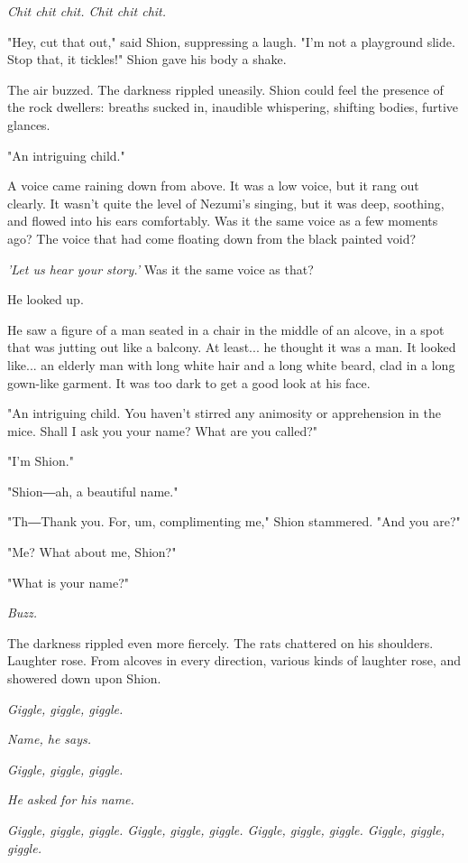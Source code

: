\emph{Chit chit chit. Chit chit chit.}

"Hey, cut that out," said Shion, suppressing a laugh. "I'm not a
playground slide. Stop that, it tickles!" Shion gave his body a shake.

The air buzzed. The darkness rippled uneasily. Shion could feel the
presence of the rock dwellers: breaths sucked in, inaudible whispering,
shifting bodies, furtive glances.

"An intriguing child."

A voice came raining down from above. It was a low voice, but it rang
out clearly. It wasn't quite the level of Nezumi's singing, but it was
deep, soothing, and flowed into his ears comfortably. Was it the same
voice as a few moments ago? The voice that had come floating down from
the black painted void?

\emph{'Let us hear your story.'} Was it the same voice as that?

He looked up.

He saw a figure of a man seated in a chair in the middle of an alcove,
in a spot that was jutting out like a balcony. At least... he thought it
was a man. It looked like... an elderly man with long white hair and a
long white beard, clad in a long gown-like garment. It was too dark to
get a good look at his face.

"An intriguing child. You haven't stirred any animosity or apprehension
in the mice. Shall I ask you your name? What are you called?"

"I'm Shion."

"Shion―ah, a beautiful name."

"Th―Thank you. For, um, complimenting me," Shion stammered. "And you
are?"

"Me? What about me, Shion?"

"What is your name?"

\emph{Buzz.}

The darkness rippled even more fiercely. The rats chattered on his
shoulders. Laughter rose. From alcoves in every direction, various kinds
of laughter rose, and showered down upon Shion.

\emph{Giggle, giggle, giggle.}

\emph{Name, he says.}

\emph{Giggle, giggle, giggle.}

\emph{He asked for his name.}

\emph{Giggle, giggle, giggle. Giggle, giggle, giggle. Giggle, giggle, giggle.
	Giggle, giggle, giggle.}

